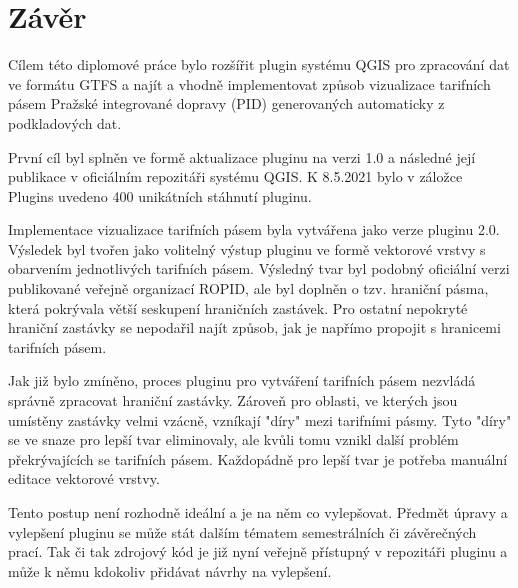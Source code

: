 \chapter*{Závěr}
\label{6-zaver}

Cílem této diplomové práce bylo rozšířit plugin systému QGIS pro zpracování dat 
ve formátu GTFS a najít a vhodně implementovat způsob vizualizace tarifních pásem Pražské integrované dopravy 
(PID) generovaných automaticky z podkladových dat.

První cíl byl splněn ve formě aktualizace pluginu na verzi 1.0 a následné její publikace v oficiálním
repozitáři systému QGIS. K 8.5.2021 bylo v záložce Plugins uvedeno 400 unikátních stáhnutí pluginu.

Implementace vizualizace tarifních pásem byla vytvářena jako verze pluginu 2.0. Výsledek
byl tvořen jako volitelný výstup pluginu ve formě vektorové vrstvy s obarvením jednotlivých tarifních pásem.
Výsledný tvar byl podobný oficiální verzi publikované veřejně organizací ROPID, ale byl doplněn o tzv. hraniční pásma,
která pokrývala větší seskupení hraničních zastávek. Pro ostatní nepokryté hraniční zastávky 
se nepodařil najít způsob, jak je napřímo propojit s hranicemi tarifních pásem.

Jak již bylo zmíněno, proces pluginu pro vytváření tarifních pásem nezvládá správně zpracovat hraniční zastávky.
Zároveň pro oblasti, ve kterých jsou umístěny zastávky velmi vzácně, vzníkají "díry" mezi tarifními pásmy.
Tyto "díry" se ve snaze pro lepší tvar eliminovaly, ale kvůli tomu vznikl další problém překrývajících se tarifních pásem.
Každopádně pro lepší tvar je potřeba manuální editace vektorové vrstvy.

Tento postup není rozhodně ideální a je na něm co vylepšovat. Předmět úpravy a vylepšení pluginu
se může stát dalším tématem semestrálních či závěrečných prací. Tak či tak zdrojový kód
je již nyní veřejně přístupný v repozitáři pluginu a může k němu kdokoliv přidávat
návrhy na vylepšení.  

